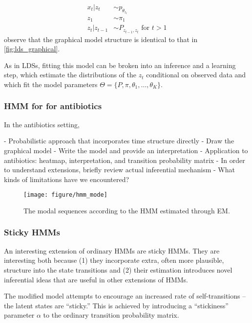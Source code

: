 \documentclass{article}
\begin{document}
\begin{align*}
  x_{t} \vert z_{t} &\sim p_{\theta_{z_{t}}} \\
  z_{1} &\sim \pi_{1} \\
  z_{t} \vert z_{t - 1} &\sim P_{z_{t - 1}, z_{t}} \text{ for } t > 1
\end{align*}
observe that the graphical model structure is identical to that in
\ref{fig:lds_graphical}.

As in LDSs, fitting this model can be broken into an inference and a learning
step, which estimate the distributions of the $z_{t}$ conditional on observed
data and which fit the model parameters $\Theta = \{P, \pi, \theta_{1}, \dots,
\theta_{K}\}$.

\subsubsection{HMM for for antibiotics}
\label{subsubsec:hmm_for_antibiotics}

In the antibiotics setting, 

- Probabilistic approach that incorporates time structure directly
- Draw the graphical model
- Write the model and provide an interpretation
- Application to antibiotics: heatmap, interpretation, and transition
probability matrix
- In order to understand extensions, briefly review actual inferential mechanism
- What kinds of limitations have we encountered?

\begin{figure}[ht]
  \centering
  \texttt{[image: figure/hmm\_mode]}
  \caption{The modal sequences according to the HMM estimated through
    EM. \label{fig:hmm_mode} }
\end{figure}

\subsubsection{Sticky HMMs}

An interesting extension of ordinary HMMs are sticky HMMs. They are interesting
both because (1) they incorporate extra, often more plausible, structure into
the state transitions and (2) their estimation introduces novel inferential
ideas that are useful in other extensions of HMMs.

The modified model attempts to encourage an increased rate of self-transitions
-- the latent states are ``sticky.'' This is achieved by introducing a
``stickiness'' parameter $\alpha$ to the ordinary transition probability matrix.
\end{document}
